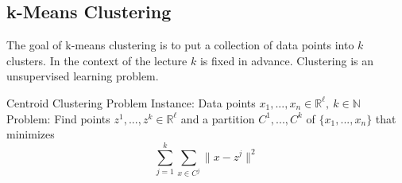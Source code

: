 \documentclass[english]{panikzettel}
\begin{document}
%
%
%

\subsection{k-Means Clustering}
The goal of k-means clustering is to put a collection of data points into $k$ clusters. In the context of the lecture $k$ is fixed in advance. Clustering is an unsupervised learning problem.\\

\begin{defi}{Centroid Clustering Problem}
Instance: Data points $x_1,..., x_n\in\mathbb{R}^\ell, \ k\in\mathbb{N}$ \\
Problem:  Find points $z^1,...,z^k\in\mathbb{R}^\ell$ and a partition $C^1,...,C^k$ of $\{x_1,...,x_n \}$ that minimizes
\[
\sum_{j=1}^k \sum_{x\in C^j} \parallel x-z^j \parallel^2
\]
\end{defi}
\end{document}

